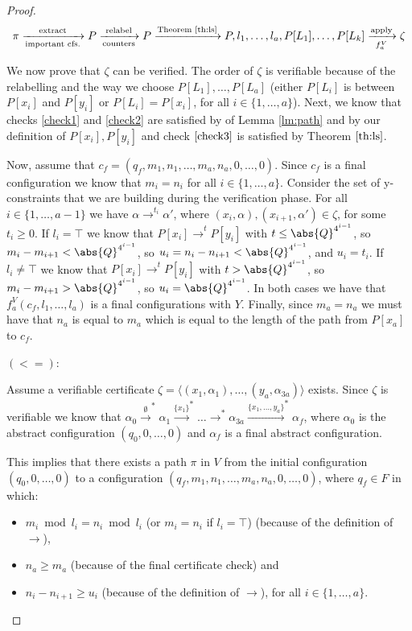 \begin{proof}
$$
\pi\xrightarrow[\text{important cfs.}]{\text{extract}}P\xrightarrow[\text{counters}]{\text{relabel}}P\xrightarrow{\text{Theorem \ref{th:ls}}}P,l_1,\dots,l_a,P[L_1],\dots,P[L_k]\xrightarrow[f^V_a]{\text{apply}}\zeta
$$

We now prove that $\zeta$ can be verified. The order of $\zeta$ is verifiable because of the relabelling and the way we choose $P[L_1],\dots,P[L_a]$ (either $P[L_i]$ is between $P[x_i]$ and $P[y_i]$ or $P[L_i]=P[x_i]$, for all $i\in\{1,\dots,a\}$). Next, we know that checks \ref{check1} and \ref{check2} are satisfied by of Lemma \ref{lm:path} and by our definition of $P[x_i],P[y_i]$ and check $\ref{check3}$ is satisfied by Theorem $\ref{th:ls}$. 

Now, assume that $c_f=(q_f,m_1,n_1,\dots,m_a,n_a,0,\dots,0)$. Since $c_f$ is a final configuration we know that $m_i=n_i$ for all $i\in\{1,\dots,a\}$. Consider the set of y-constraints that we are building during the verification phase. For all $i\in\{1,\dots,a-1\}$ we have $\alpha\xrightarrow{}^{t_i}\alpha'$, where $(x_i,\alpha),(x_{i+1},\alpha')\in\zeta$, for some $t_i\geq 0$. If $l_i=\top$ we know that $P[x_i]\xrightarrow{}^t P[y_i]$ with $t\leq\abs{Q}^{4^{i-1}}$, so $m_i-m_{i+1}<\abs{Q}^{4^{i-1}}$, so $u_i=n_i-n_{i+1}<\abs{Q}^{4^{i-1}}$, and $u_i=t_i$. If $l_i\neq\top$ we know that $P[x_i]\xrightarrow{}^t P[y_i]$ with $t>\abs{Q}^{4^{i-1}}$, so $m_i-m_{i+1}>\abs{Q}^{4^{i-1}}$, so $u_i=\abs{Q}^{4^{i-1}}$. In both cases we have that $f_a^V(c_f,l_1,\dots,l_a)$ is a final configurations with $Y$. Finally, since $m_a=n_a$ we must have that $n_a$ is equal to $m_a$ which is equal to the length of the path from $P[x_a]$ to $c_f$. 

$(<=):$

Assume a verifiable certificate $\zeta=\langle(x_1,\alpha_1),\dots,(y_a,\alpha_{3a})\rangle$ exists. Since $\zeta$ is verifiable we know that $\alpha_0\xrightarrow{\emptyset}^*\alpha_1\xrightarrow{\{x_1\}}^*\dots\xrightarrow{}^*\alpha_{3a}\xrightarrow{\{x_1,\dots,y_a\}}^*\alpha_f$, where $\alpha_0$ is the abstract configuration $(q_0,0,\dots,0)$ and $\alpha_f$ is a final abstract configuration. 

This implies that there exists a path $\pi$ in $V$ from the initial configuration $(q_0,0,\dots,0)$ to a configuration $(q_f,m_1,n_1,\dots,m_a,n_a,0,\dots,0)$, where $q_f\in F$ in which:
\begin{itemize}
    \item $m_i\bmod l_i = n_i\bmod l_i$ (or $m_i=n_i$ if $l_i=\top$) (because of the definition of $\xrightarrow{}$),
    \item $n_a\geq m_a$ (because of the final certificate check) and
    \item $n_{i}-n_{i+1}\geq u_i$ (because of the definition of $\xrightarrow{}$), for all $i\in\{1,\dots,a\}$.
\end{itemize}


\end{proof}
